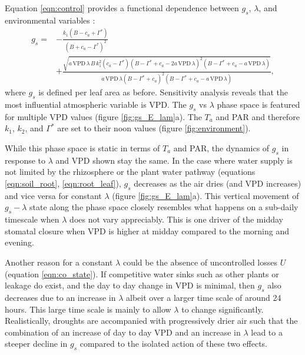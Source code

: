 \documentclass[utf8]{frontiersSCNS} %
\begin{document}
Equation \ref{eqn:control} provides a functional dependence between $g_s$, $\lambda$, and environmental variables \citep{katul_stomatal_2009}:
\begin{equation}
    \label{eqn:gs_vs_env_lambda}
    \begin{split}
        g_s = & - \frac{k_1 (B - c_a + \Gamma^*)}{(B+c_a - \Gamma^*)^2} \\
        & +\frac{\sqrt{a\, \text{VPD}\, \lambda\, B\,k_1^2 (c_a-\Gamma^*)(B - \Gamma^* +c_a-2 a\, \text{VPD}\, \lambda)^2(B - \Gamma^* +c_a-a\, \text{VPD}\, \lambda)}}{a\, \text{VPD}\, \lambda (B - \Gamma^* +c_a)^2(B - \Gamma^* +c_a-a\, \text{VPD}\, \lambda)} ,
    \end{split}
\end{equation}
where $g_s$ is defined per leaf area as before. Sensitivity analysis reveals that the most influential atmospheric variable is VPD. The $g_s$ vs $\lambda$ phase space is featured for multiple VPD values (figure \ref{fig:gs_E_lam}a).  The $T_a$ and PAR and therefore $k_1$, $k_2$, and $\Gamma^*$ are set to their noon values (figure \ref{fig:environment}).

While this phase space is static in terms of $T_a$ and PAR, the dynamics of $g_s$ in response to $\lambda$ and VPD shown stay the same. In the case where water supply is not limited by the rhizosphere or the plant water pathway (equations \ref{eqn:soil_root}, \ref{eqn:root_leaf}), $g_s$ decreases as the air dries (and VPD increases) and vice versa for constant $\lambda$ (figure \ref{fig:gs_E_lam}a). This vertical movement of $g_s-\lambda$ state along the phase space closely resembles what happens on a sub-daily timescale when $\lambda$ does not vary appreciably. This is one driver of the midday stomatal closure when VPD is higher at midday compared to the morning and evening.

Another reason for a constant $\lambda$ could be the absence of uncontrolled losses $U$ (equation \ref{eqn:co_state}). If competitive water sinks such as other plants or leakage do exist, and the day to day change in VPD is minimal, then $g_s$ also decreases due to an increase in $\lambda$ albeit over a larger time scale of around 24 hours. This large time scale is mainly to allow $\lambda$ to change significantly. Realistically, droughts are accompanied with progressively drier air such that the combination of an increase of day to day VPD and an increase in $\lambda$ lead to a steeper decline in $g_s$ compared to the isolated action of these two effects.
\end{document}
